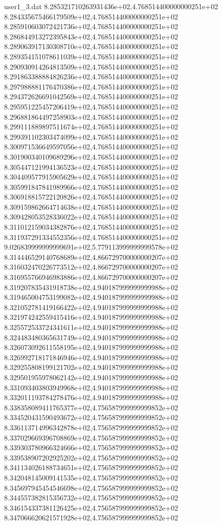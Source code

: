 \begin{filecontents}{user1_3.dat}
8.285321710263931436e+02,4.768514400000000251e+02
8.284335675466179509e+02,4.768514400000000251e+02
8.285910603072421736e+02,4.768514400000000251e+02
8.286844913272395843e+02,4.768514400000000251e+02
8.289063917130308710e+02,4.768514400000000251e+02
8.289354151078611039e+02,4.768514400000000251e+02
8.290930914264813509e+02,4.768514400000000251e+02
8.291863388884826236e+02,4.768514400000000251e+02
8.297988881176470386e+02,4.768514400000000251e+02
8.294372626691042569e+02,4.768514400000000251e+02
8.295951225457206419e+02,4.768514400000000251e+02
8.296881864497258903e+02,4.768514400000000251e+02
8.299111889897511674e+02,4.768514400000000251e+02
8.299391102303474099e+02,4.768514400000000251e+02
8.300971536649597056e+02,4.768514400000000251e+02
8.301900340109689296e+02,4.768514400000000251e+02
8.305447121994136523e+02,4.768514400000000251e+02
8.304409577915905629e+02,4.768514400000000251e+02
8.305991847841989966e+02,4.768514400000000251e+02
8.306918815722120826e+02,4.768514400000000251e+02
8.309159862664714638e+02,4.768514400000000251e+02
8.309428053528336022e+02,4.768514400000000251e+02
8.311012159034382876e+02,4.768514400000000251e+02
8.311937291334552356e+02,4.768514400000000251e+02
9.026839999999999691e+02,5.779113999999999578e+02
8.314446529140768689e+02,4.866729700000000207e+02
8.316032470226773512e+02,4.866729700000000207e+02
8.316955766946983886e+02,4.866729700000000207e+02
8.319207835431918738e+02,4.940187999999999988e+02
8.319465004753199082e+02,4.940187999999999988e+02
8.321052781419166422e+02,4.940187999999999988e+02
8.321974242559415416e+02,4.940187999999999988e+02
8.325572533724341611e+02,4.940187999999999988e+02
8.324483480365631749e+02,4.940187999999999988e+02
8.326073092611558195e+02,4.940187999999999988e+02
8.326992718171846946e+02,4.940187999999999988e+02
8.329255808199121702e+02,4.940187999999999988e+02
8.329501955978062142e+02,4.940187999999999988e+02
8.331093403803949968e+02,4.940187999999999988e+02
8.332011193784278476e+02,4.940187999999999988e+02
8.338358089411765377e+02,4.756587999999999852e+02
8.334520431590493672e+02,4.756587999999999852e+02
8.336113714996342878e+02,4.756587999999999852e+02
8.337029669396708869e+02,4.756587999999999852e+02
8.339303780966324666e+02,4.756587999999999852e+02
8.339538907202925202e+02,4.756587999999999852e+02
8.341134026188734651e+02,4.756587999999999852e+02
8.342048145009141535e+02,4.756587999999999852e+02
8.345697945454546698e+02,4.756587999999999852e+02
8.344557382815356732e+02,4.756587999999999852e+02
8.346154337381126425e+02,4.756587999999999852e+02
8.347066620621571928e+02,4.756587999999999852e+02

\end{filecontents}
